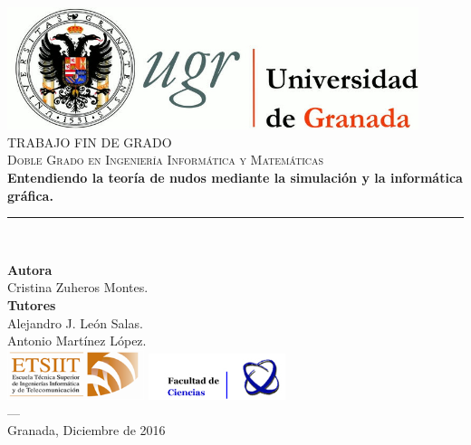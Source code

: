\begin{titlepage}
 
 
\newlength{\centeroffset}
\setlength{\centeroffset}{-0.5\oddsidemargin}
\addtolength{\centeroffset}{0.5\evensidemargin}
\thispagestyle{empty}

\noindent\hspace*{\centeroffset}\begin{minipage}{\textwidth}

\centering
\includegraphics[width=0.9\textwidth]{img/logo_ugr.jpg}\\[1.4cm]

\textsc{ \Large TRABAJO FIN DE GRADO\\[0.2cm]}
\textsc{ Doble Grado en Ingeniería Informática y Matemáticas}\\[1cm]
% 
{\LARGE\bfseries Entendiendo la teoría de nudos mediante la simulación y la informática gráfica. 
\\
}
\noindent\rule[-1ex]{\textwidth}{3pt}\\[3.5ex]
\end{minipage}

\vspace{2.5cm}
\noindent\hspace*{\centeroffset}\begin{minipage}{\textwidth}
\centering

\textbf{Autora}\\ {Cristina Zuheros Montes.}\\[2.5ex]
\textbf{Tutores}\\
{Alejandro J. León Salas.}\\
{Antonio Martínez López.}\\[2cm]
\includegraphics[width=0.3\textwidth]{img/logo_etsiit.png} \hfill \includegraphics[width=0.3\textwidth]{img/logo_ciencias.jpg}\\[0.1cm]
\textsc{---}\\
Granada, Diciembre de 2016
\end{minipage}
\end{titlepage}